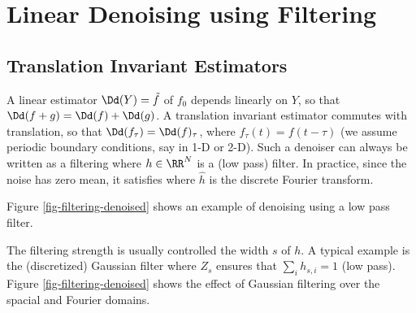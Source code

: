 \section{Linear Denoising using Filtering}
\label{sec-linear-denoising}

\subsection{Translation Invariant Estimators}

A linear estimator $\Dd(Y) = \tilde f$ of $f_0$ depends linearly on $Y$, so that $\Dd(f+g) = \Dd(f)+\Dd(g)$.
A translation invariant estimator commutes with translation, so that $\Dd(f_\tau) = \Dd(f)_\tau$, where $f_\tau(t) = f(t-\tau)$ (we assume periodic boundary conditions, say in 1-D or 2-D).
%
Such a denoiser can always be written as a filtering
where $h \in \RR^N$ is a (low pass) filter. In practice, since the noise has zero mean, it satisfies 
where $\hat h$ is the discrete Fourier transform. 

Figure \ref{fig-filtering-denoised} shows an example of denoising using a low pass filter.


The filtering strength is usually controlled the width $s$ of $h$. A typical example is the (discretized) Gaussian filter
where $Z_s$ ensures that $\sum_i h_{s,i}=1$ (low pass). Figure \ref{fig-filtering-denoised} shows the effect of Gaussian filtering over the spacial and Fourier domains.

